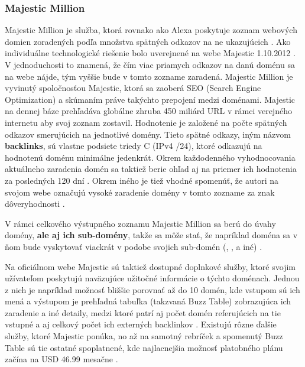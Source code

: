 \subsubsection{Majestic Million}

Majestic Million je služba, ktorá rovnako ako Alexa poskytuje zoznam webových domien zoradených podľa množstva spätných odkazov na ne ukazujúcich \cite{majestic-million-homepage}\cite{majestic-million-ranking}.
Ako individuálne technologické riešenie bolo uverejnené na webe Majestic 1.10.2012 \cite{majestic-million-publication}.
V jednoduchosti to znamená, že čím viac priamych odkazov na danú doménu sa na webe nájde, tým vyššie bude v tomto zozname zaradená. 
Majestic Million je vyvinutý spoločnosťou Majestic, ktorá sa zaoberá SEO (Search Engine Optimization) a skúmaním práve takýchto prepojení medzi doménami.
Majestic na dennej báze prehľadáva globálne zhruba 450 miliárd URL v rámci verejného internetu aby svoj zoznam zostavil. 
Hodnotenie je založené na počte spätných odkazov smerujúcich na jednotlivé domény. Tieto spätné odkazy, iným názvom \textbf{backlinks}, sú vlastne podsiete triedy C (IPv4 /24), ktoré odkazujú
na hodnotenú doménu minimálne jedenkrát.
Okrem každodenného vyhodnocovania aktuálneho zaradenia domén sa taktiež berie ohľad aj na priemer ich hodnotenia za posledných 120 dní \cite{tranco-methodology}.
Okrem iného je tiež vhodné spomenúť, že autori na svojom webe označujú vysoké zaradenie domény v tomto zozname za znak dôveryhodnosti \cite{majestic-million-homepage}.

V rámci celkového výstupného zoznamu Majestic Million sa berú do úvahy domény, \textbf{ale aj ich sub-domény}, takže sa môže stať, že napríklad doména  sa v ňom bude vyskytovať viackrát v podobe 
svojich sub-domén (, ,  a iné) \cite{majestic-million-sub-domain-filtered}.

Na oficiálnom webe Majestic sú taktiež dostupné doplnkové služby, ktoré svojim užívateľom poskytujú naväzujúce užitočné informácie o týchto doménach. 
Jednou z nich je napríklad možnosť bližšie porovnať až do 10 domén, kde vstupom sú ich mená a výstupom je prehľadná tabuľka (takzvaná Buzz Table) zobrazujúca ich zaradenie a iné detaily, medzi ktoré patrí aj počet domén
referujúcich na tie vstupné a aj celkový počet ich externých backlinkov \cite{majestic-million-homepage}.
Existujú rôzne ďalšie služby, ktoré Majestic ponúka, no až na samotný rebríček a spomenutý Buzz Table sú tie ostatné spoplatnené, kde najlacnejšia možnosť platobného plánu začína na USD 46.99 mesačne \cite{majestic-million-pricing}.

